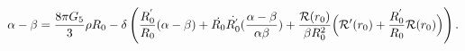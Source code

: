 \begin{equation}
\label{alpabeta3}
 \alpha - \beta =
 \frac{8\pi G_{5}}{3}\rho
R_{0}-\delta \left(\frac{R^{'}_{0}}{R_{0}}(\alpha -
\beta)+\dot{{R}_{0}} \dot{{R}^{'}_{0}}(\frac{\alpha - \beta}
{\alpha\beta})+\frac{{\cal R}(r_{0})}{\beta R_{0}^2}\Bigl({\cal
R'} (r_{0})+\frac{R^{'}_{0}}{R_{0}}{\cal R}(r_{0})\Bigr)\right).
\end{equation}

